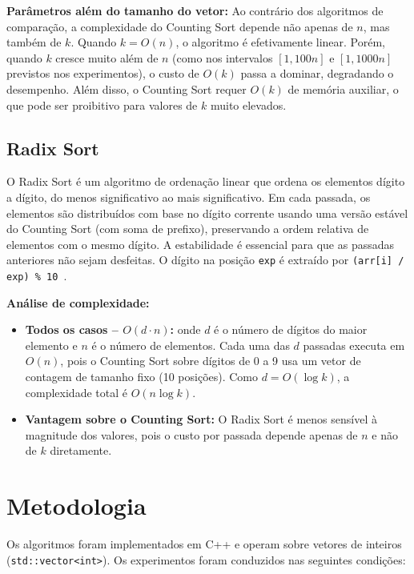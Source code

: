 \documentclass[12pt]{article}
\begin{document}
\textbf{Parâmetros além do tamanho do vetor:}
Ao contrário dos algoritmos de comparação, a complexidade do Counting Sort
depende não apenas de $n$, mas também de $k$. Quando $k = O(n)$, o algoritmo
é efetivamente linear. Porém, quando $k$ cresce muito além de $n$ (como nos
intervalos $[1, 100n]$ e $[1, 1000n]$ previstos nos experimentos), o custo de
$O(k)$ passa a dominar, degradando o desempenho. Além disso, o Counting Sort
requer $O(k)$ de memória auxiliar, o que pode ser proibitivo para valores de
$k$ muito elevados.

\subsection{Radix Sort}

O Radix Sort é um algoritmo de ordenação linear que ordena os elementos
dígito a dígito, do menos significativo ao mais significativo. Em cada
passada, os elementos são distribuídos com base no dígito corrente usando
uma versão estável do Counting Sort (com soma de prefixo), preservando a
ordem relativa de elementos com o mesmo dígito. A estabilidade é essencial
para que as passadas anteriores não sejam desfeitas. O dígito na posição
\texttt{exp} é extraído por \texttt{(arr[i] / exp) \% 10}~\cite{gfg-radix}.

\textbf{Análise de complexidade:}
\begin{itemize}
  \item \textbf{Todos os casos -- $O(d \cdot n)$:} onde $d$ é o número de
    dígitos do maior elemento e $n$ é o número de elementos. Cada uma das
    $d$ passadas executa em $O(n)$, pois o Counting Sort sobre dígitos de
    0 a 9 usa um vetor de contagem de tamanho fixo (10 posições). Como
    $d = O(\log k)$, a complexidade total é $O(n \log k)$.
  \item \textbf{Vantagem sobre o Counting Sort:} O Radix Sort é menos
    sensível à magnitude dos valores, pois o custo por passada depende
    apenas de $n$ e não de $k$ diretamente.
\end{itemize}

\section{Metodologia}
\label{sec:metodologia}

Os algoritmos foram implementados em C++ e operam sobre vetores de inteiros
(\texttt{std::vector<int>}). Os experimentos foram conduzidos nas seguintes
condições:
\end{document}
